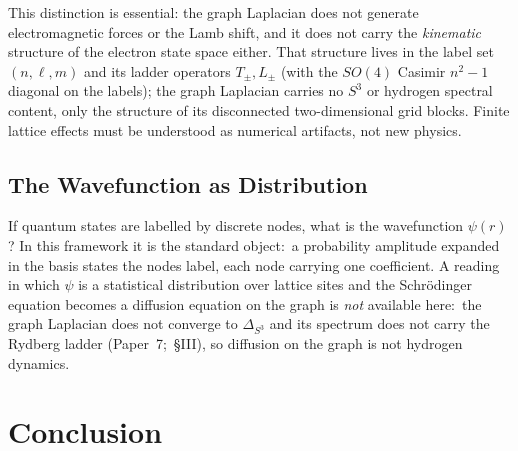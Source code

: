 \documentclass[aps,pra,twocolumn,superscriptaddress,longbibliography]{revtex4-2}
\newcommand{\gvc}[2]{#2}
\begin{document}
This distinction is essential: \gvc{graph-s3-wall}{the graph Laplacian does not generate
electromagnetic forces or the Lamb shift, and it does not carry the
\textit{kinematic} structure of the electron state space either}. That
structure lives in the label set $(n,\ell,m)$ and its ladder operators
$T_\pm, L_\pm$ (with the $SO(4)$ Casimir $n^2-1$ diagonal on the
labels); \gvc{graph-s3-wall}{the graph Laplacian carries no $S^3$ or hydrogen spectral
content, only the structure of its disconnected two-dimensional grid
blocks}. Finite
lattice effects must be understood as numerical artifacts, not
new physics.

\subsection{The Wavefunction as Distribution}

If quantum states are labelled by discrete nodes, what is the wavefunction $\psi(r)$? In this framework it is the standard object:\ a probability amplitude expanded in the basis states the nodes label, each node carrying one coefficient. A reading in which $\psi$ is a statistical distribution over lattice sites and the Schr\"odinger equation becomes a diffusion equation on the graph is \emph{not} available here:\ \gvc{graph-s3-wall}{the graph Laplacian does not converge to $\Delta_{S^3}$ and its spectrum does not carry the Rydberg ladder (Paper~7;\ \S III)}, so diffusion on the graph is not hydrogen dynamics.


\section{Conclusion}
\label{sec:conclusion}
\end{document}
